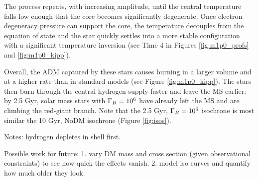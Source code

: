 \documentclass[useAMS,usenatbib]{mnras}
\begin{document}
  The process repeats, with increasing amplitude, until the central temperature falls low enough that the core becomes significantly degenerate. Once electron degeneracy pressure can support the core, the temperature decouples from the equation of state and the star quickly settles into a more stable configuration with a significant temperature inversion (see Time 4 in Figures \ref{fig:m1p0_profs} and \ref{fig:m1p0_kipp}).

  Overall, the ADM captured by these stars causes burning in a larger volume and at a higher rate than in standard models (see Figure \ref{fig:m1p0_kipp}). The stars then burn through the central hydrogen supply faster and leave the MS earlier: by 2.5 Gyr, solar mass stars with $\Gamma_B = 10^{6}$ have already left the MS and are climbing the red-giant branch. Note that the 2.5 Gyr, $\Gamma_B = 10^{6}$ isochrone is most similar the 10 Gyr, NoDM isochrone (Figure \ref{fig:isos}).


  Notes:
  hydrogen depletes in shell first.


  Possible work for future: 1. vary DM mass and cross section (given observational constraints) to see how quick the effects vanish. 2. model iso curves and quantify how much older they look.




\end{document}
